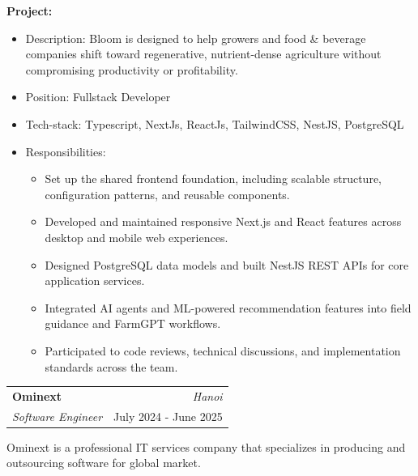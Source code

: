 \documentclass[a4paper, 11pt]{article}
\makeatletter
\newcommand{\resumeSubheading}[4]{
\vspace{0.5mm}
\item
\begin{tabular*}{0.98\textwidth}[t]{l@{\extracolsep{\fill}}r}
	\textbf{#1}                & \textit{\footnotesize{#4}} \\
	\textit{\footnotesize{#3}} & \footnotesize{#2}          \\
\end{tabular*}
\vspace{-2.4mm}
}
\newcommand{\projectHeading}[1]{%
\textbf{Project:} \text{#1}%
\vspace{-3.0mm}%
}
\newcommand{\responsibilities}{%
\item{Responsibilities:}%
\begin{itemize}[leftmargin=6ex,noitemsep,labelsep=1mm,itemsep=0mm,label={·}]\small%
}
\newcommand{\responsibilitiesEnd}{\end{itemize}}
\newcommand{\companyDesc}[1]{%
\vspace{4.0mm}%
#1%
\vspace{2.0mm}%
}
\newcommand{\resumeItemListStart}{\begin{justify}\begin{itemize}[leftmargin=3ex,
rightmargin=2ex, noitemsep,labelsep=1.2mm,itemsep=0mm]\small}
\newcommand{\resumeItemListEnd}{\end{itemize}\end{justify}
\vspace{-2mm}}
\makeatother
\begin{document}
\projectHeading{Bloom}
\resumeItemListStart
\item {Description: Bloom is designed to help growers and food \& beverage companies
            shift toward regenerative, nutrient-dense agriculture without compromising
            productivity or profitability.}
\item {Position: Fullstack Developer}
\item {Tech-stack: Typescript, NextJs, ReactJs, TailwindCSS, NestJS, PostgreSQL}
\responsibilities
\item {Set up the shared frontend foundation, including scalable structure, configuration patterns, and reusable components.}
\item {Developed and maintained responsive Next.js and React features across desktop and mobile web experiences.}
\item {Designed PostgreSQL data models and built NestJS REST APIs for core application services.}
\item {Integrated AI agents and ML-powered recommendation features into field guidance and FarmGPT workflows.}
\item {Participated to code reviews, technical discussions, and implementation standards across the team.}
\responsibilitiesEnd
\resumeItemListEnd

\resumeSubheading{Ominext}{July 2024 - June 2025}{Software Engineer}{Hanoi}
\companyDesc{
	Ominext is a professional IT services company that specializes in producing and outsourcing software for global market.
}
\end{document}
